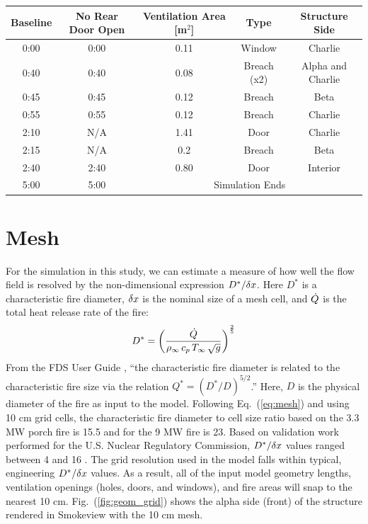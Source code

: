 \documentclass[11pt,oneside]{book}
\begin{document}
\bigskip
\begin{minipage}{.8\linewidth}
\centering
{}\label{tab:vents}
\begin{tabular}{ccccc}
\toprule[1.5pt]
Baseline & No Rear Door Open & Ventilation Area [m$^2$] & Type & Structure Side \\
\midrule
0:00    &  0:00  & 0.11 & Window      & Charlie \\
0:40    &  0:40  & 0.08 & Breach (x2) & Alpha and Charlie \\
0:45    &  0:45  & 0.12 & Breach      & Beta \\
0:55    &  0:55  & 0.12 & Breach      & Charlie \\     
2:10    &  N/A   & 1.41 & Door        & Charlie \\
2:15    &  N/A   & 0.2  & Breach      & Beta \\        
2:40    &  2:40  & 0.80 & Door        & Interior \\
5:00    &  5:00  & \multicolumn{3}{c}{Simulation Ends}  \\
\bottomrule[1.25pt]
\end{tabular}\par
\bigskip
\end{minipage}

\section{Mesh}
\label{mesh}

For the simulation in this study, we can estimate a measure of how well the flow field is resolved by the non-dimensional expression $D^*/\delta x$. Here $D^*$ is a characteristic fire diameter, $\delta x$ is the nominal size of a mesh cell, and $\dot{Q}$ is the total heat release rate of the fire:
\begin{equation}
D^* = \left(
     \frac{\dot{Q}}{\rho_\infty \, c_p \, T_\infty \, \sqrt{g} }
     \right)^\frac{2}{5} 
\label{eq:mesh}
\end{equation}   
From the FDS User Guide \cite{FDS_Users_Guide}, ``the characteristic fire diameter is related to the characteristic fire size via the
relation $Q^* = (D^*/D)^{5/2}$.'' Here, $D$ is the physical diameter of the fire as input to the model. Following Eq.~(\ref{eq:mesh}) and using 10 cm grid cells, the characteristic fire diameter to cell size ratio based on the 3.3 MW porch fire is 15.5 and for the 9 MW fire is 23. Based on validation work performed for the U.S. Nuclear Regulatory Commission, $D^*/\delta x$ values ranged between 4 and 16 \cite{NUREG_1824}. The grid resolution used in the model falls within typical, engineering $D^*/\delta x$ values. As a result, all of the input model geometry lengths, ventilation openings (holes, doors, and windows), and fire areas will snap to the nearest 10 cm. Fig.~(\ref{fig:geom_grid}) shows the 
alpha side (front) of the structure rendered in Smokeview with the 10 cm mesh.
\end{document}

